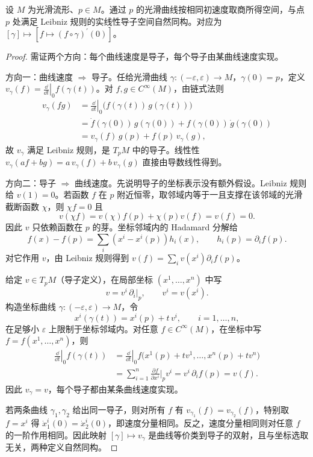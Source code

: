 \begin{proposition}[切向量的两种定义]
设 $M$ 为光滑流形、$p\in M$。通过 $p$ 的光滑曲线按相同初速度取商所得空间，与点 $p$ 处满足 Leibniz 规则的实线性导子空间自然同构。对应为 $[\gamma]\mapsto[f\mapsto (f\circ\gamma)^\prime(0)]$。
\end{proposition}
\begin{proof}
需证两个方向：每个曲线速度是导子，每个导子由某曲线速度实现。

方向一：曲线速度 $\Rightarrow$ 导子。任给光滑曲线 $\gamma:(-\varepsilon,\varepsilon)\to M$，$\gamma(0)=p$，定义 $v_\gamma(f)=\left.\frac{\dd}{\dd t}\right|_0 f(\gamma(t))$。对 $f,g\in C^\infty(M)$，由链式法则
\begin{align*}
 v_\gamma(fg)
 &=\left.\frac{\dd}{\dd t}\right|_0\bigl(f(\gamma(t))\,g(\gamma(t))\bigr)\\
 &=\dot f(\gamma(0))\,g(\gamma(0))+f(\gamma(0))\,\dot g(\gamma(0))\\
 &=v_\gamma(f)\,g(p)+f(p)\,v_\gamma(g),
\end{align*}
故 $v_\gamma$ 满足 Leibniz 规则，是 $T_pM$ 中的导子。线性性 $v_\gamma(af+bg)=a\,v_\gamma(f)+b\,v_\gamma(g)$ 直接由导数线性得到。

方向二：导子 $\Rightarrow$ 曲线速度。先说明导子的坐标表示没有额外假设。Leibniz 规则给 $v(1)=0$。若函数 $f$ 在 $p$ 附近恒零，取邻域内等于一且支撑在该邻域的光滑截断函数 $\chi$，则 $\chi f=0$ 且
\[
v(\chi f)=v(\chi)f(p)+\chi(p)v(f)=v(f)=0.
\]
因此 $v$ 只依赖函数在 $p$ 的芽。坐标邻域内的 Hadamard 分解给
\[
f(x)-f(p)=\sum_i(x^i-x^i(p))h_i(x),\qquad h_i(p)=\partial_i f(p).
\]
对它作用 $v$，由 Leibniz 规则得到 $v(f)=\sum_i v(x^i)\partial_i f(p)$。

给定 $v\in T_pM$（导子定义），在局部坐标 $(x^1,\ldots,x^n)$ 中写
\begin{equation*}
 v=v^i\,\partial_i\big|_p,
 \qquad
 v^i=v(x^i).
\end{equation*}
构造坐标曲线 $\gamma:(-\varepsilon,\varepsilon)\to M$，令
\begin{equation*}
 x^i(\gamma(t))=x^i(p)+t\,v^i,
 \qquad i=1,\ldots,n,
\end{equation*}
在足够小 $\varepsilon$ 上限制于坐标邻域内。对任意 $f\in C^\infty(M)$，在坐标中写 $f=f(x^1,\ldots,x^n)$，则
\begin{align*}
 \left.\frac{\dd}{\dd t}\right|_0 f(\gamma(t))
 &=\left.\frac{\dd}{\dd t}\right|_0 f\bigl(x^1(p)+tv^1,\ldots,x^n(p)+tv^n\bigr)\\
 &=\sum_{i=1}^n \frac{\partial f}{\partial x^i}\bigg|_p v^i
 =v^i\,\partial_i f(p)=v(f).
\end{align*}
因此 $v_\gamma=v$，每个导子都由某条曲线速度实现。

若两条曲线 $\gamma_1,\gamma_2$ 给出同一导子，则对所有 $f$ 有 $v_{\gamma_1}(f)=v_{\gamma_2}(f)$，特别取 $f=x^i$ 得 $\dot x^i_1(0)=\dot x^i_2(0)$，即速度分量相同。反之，速度分量相同则对任意 $f$ 的一阶作用相同。因此映射 $[\gamma]\mapsto v_\gamma$ 是曲线等价类到导子的双射，且与坐标选取无关，两种定义自然同构。
\end{proof}

